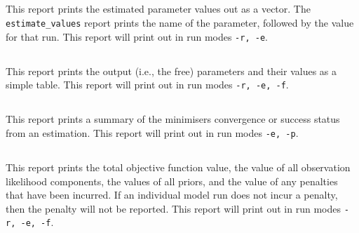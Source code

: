 

\subsection{}\label{sec:Report-EstimateValue}

This report prints the estimated parameter values out as a vector. The \texttt{estimate\_values} report prints the name of the parameter, followed by the value for that run. This report will print out in run modes \texttt{-r, -e}.

\subsection{}\label{sec:Report-OutputParameters}
This report prints the output (i.e., the free) parameters and their values as a simple table. This report will print out in run modes \texttt{-r, -e, -f}.

\subsection{}\label{sec:Report-EstimationResult}

This report prints a summary of the minimisers convergence or success status from an estimation. This report will print out in run modes \texttt{-e, -p}.

\subsection{}\label{sec:Report-ObjectiveFunction}

This report prints the total objective function value, the value of all observation likelihood components, the values of all priors, and the value of any penalties that have been incurred. If an individual model run does not incur a penalty, then the penalty will not be reported. This report will print out in run modes \texttt{-r, -e, -f}.

